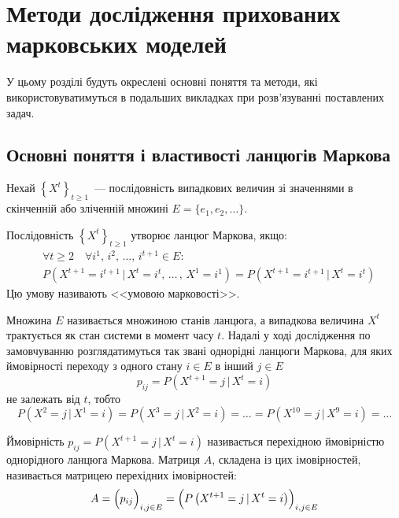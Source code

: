 
\chapter{Методи дослідження прихованих марковських моделей}
\label{chap:review}

У цьому розділі будуть окреслені основні поняття та методи, які використовуватимуться в подальших викладках при розв'язуванні поставлених задач.

\section{Основні поняття і властивості ланцюгів Маркова}

Нехай $\left\{ X^t \right\}_{t\geqslant 1}$~--- послідовність випадкових величин зі значеннями в скінченній або зліченній множині $E=\{ e_1,e_2,\ldots \}$. 

\begin{definition}
    Послідовність $\left\{ X^t \right\}_{t\geqslant 1}$ утворює ланцюг Маркова, якщо:
    \begin{align*}
        & \forall t\geqslant 2 \quad \forall i^1,\,i^2,\,\ldots,\,i^{t+1} \in E: \\
	    & P\left( X^{t+1}=i^{t+1} \, |\, X^t=i^t,\,\ldots\,,\, X^1=i^1 \right)=P\left( X^{t+1}=i^{t+1} \, |\, X^t=i^t \right)
    \end{align*}
    Цю умову називають <<умовою марковості>>.
\end{definition}

Множина $E$ називається множиною станів ланцюга, а випадкова величина $X^t$ трактується як стан системи в момент часу $t$. Надалі у ході дослідження по замовчуванню розглядатимуться так звані однорідні ланцюги Маркова, для яких ймовірності переходу з одного стану $i \in E$ в інший $j \in E$ 
\begin{equation*}
    p_{ij} = P\left( X^{t+1}=j\,|\,X^{t}=i \right)
\end{equation*}
не залежать від $t$, тобто
\begin{equation*}
    P\left( X^{2}=j\,|\,X^{1}=i \right) = P\left( X^{3}=j\,|\,X^{2}=i \right) = \ldots = P\left( X^{10}=j\,|\,X^{9}=i \right) = \ldots
\end{equation*}

Ймовірність $p_{ij} = P\left( X^{t+1}=j\,|\,X^{t}=i \right)$ називається перехідною ймовірністю однорідного ланцюга Маркова. Матриця $A$, складена із цих імовірностей, називається матрицею перехідних імовірностей:
\begin{equation*}
    A = \Bigl( p_{ij} \Bigr)_{i,j \in E} = \Bigl( P\left( X^{t+1}=j\,|\,X^{t}=i \right) \Bigr)_{i,j \in E}
\end{equation*} 

